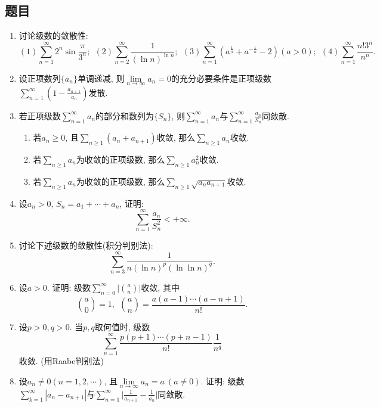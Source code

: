 \documentclass[UTF8,11pt, a4paper, oneside, fontset=none]{ctexbook}
\begin{document}
\subsection*{题目}
\begin{enumerate}

\item 讨论级数的敛散性:
\[
(1) \sum_{n=1}^{\infty} 2^n \sin \frac{\pi}{3^n}; \ \ (2) \sum_{n=2}^{\infty} \frac{1}{(\ln n)^{\ln n}}; \ \ (3) \sum_{n=1}^{\infty} (a^{\frac{1}{n}} + a^{-\frac{1}{n}} -2) (a>0); \ \ (4) \sum_{n=1}^{\infty} \frac{n! 3^n}{n^n}.
\]

\item 设正项数列$\{ a_n \}$单调递减, 则$\lim\limits_{n \to \infty} a_n = 0$的充分必要条件是正项级数$\sum_{n=1}^{\infty} \left( 1 - \frac{a_{n+1}}{a_n} \right)$发散.

\item 若正项级数$\sum_{n=1}^{\infty} a_n$的部分和数列为$\{ S_n \}$, 则$\sum_{n=1}^{\infty} a_n$与$\sum_{n=1}^{\infty} \frac{a_n}{S_n}$同敛散.

\begin{enumerate}
\item 若$a_n \geq 0$, 且$\sum_{n \geq 1} (a_n + a_{n+1})$收敛, 那么$\sum_{n \geq 1} a_n$收敛.
\item 若$\sum_{n \geq 1} a_n$为收敛的正项级数, 那么$\sum_{n \geq 1} a_n^2$收敛.
\item 若$\sum_{n \geq 1} a_n$为收敛的正项级数, 那么$\sum_{n \geq 1} \sqrt{a_n a_{n+1}}$收敛.
\end{enumerate}

\item 设$a_n >0$, $ S_n = a_1 + \cdots + a_n$, 证明:
\[
\sum_{n=1}^{\infty} \frac{a_n}{S_n^2} < +\infty.
\]

\item 讨论下述级数的敛散性(积分判别法):
\[
\sum_{n=3}^{\infty} \frac{1}{n (\ln n)^p (\ln \ln n)^q}.
\]

\item 设$a > 0$. 证明: 级数$\sum_{n=0}^{\infty} \Big| \binom{a}{n} \Big|$收敛, 其中
\[
\binom{a}{0} =1, \ \ \binom{a}{n} = \frac{a (a-1) \cdots (a-n+1)}{n!}.
\]

\item 设$p>0, q>0$. 当$p, q$取何值时, 级数
\[
\sum_{n=1}^{\infty} \frac{p(p+1)\cdots (p+n-1)}{n!} \frac{1}{n^q}
\]
收敛. (用Raabe判别法)

\item 设$a_n \neq 0 (n = 1, 2, \cdots)$, 且$\lim\limits_{n \to \infty} a_n = a \ (a \neq 0)$. 证明: 级数$\sum_{k=1}^{\infty} |a_n - a_{n+1}|$与$\sum_{n=1}^{\infty} \Big| \frac{1}{a_{n+1}} - \frac{1}{a_n} \Big|$同敛散.


\end{enumerate}
\end{document}
